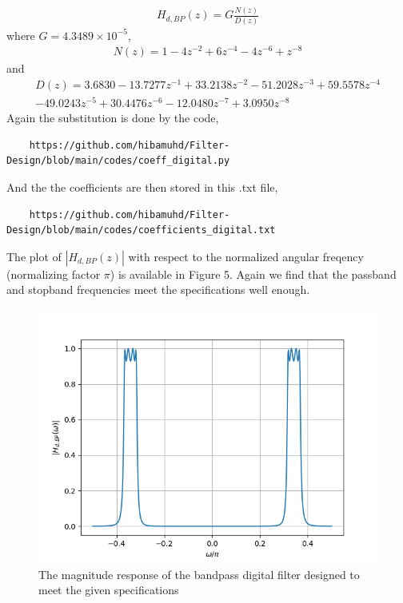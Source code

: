 \documentclass{article}
\begin{document}
\begin{eqnarray}
H_{d,BP}(z) = G \frac{N(z)}{D(z)}
\end{eqnarray}
where $G = 4.3489 \times 10^{-5}$,
\begin{eqnarray}
N(z)=  1 - 4 z^{-2} + 6 z^{-4} - 4z^{-6} + z^{-8} 
\end{eqnarray}
and
\begin{eqnarray}
D(z) = 3.6830  -13.7277z^{-1} + 33.2138z^{-2}  -51.2028z^{-3}+  59.5578z^{-4}\nonumber \\
  -49.0243z^{-5}+   30.4476z^{-6}  -12.0480z^{-7} +   3.0950z^{-8}
\end{eqnarray}
Again the substitution is done by the code,
\begin{lstlisting}
    https://github.com/hibamuhd/Filter-Design/blob/main/codes/coeff_digital.py
\end{lstlisting}
And the the coefficients are then stored in this .txt file,
\begin{lstlisting}
    https://github.com/hibamuhd/Filter-Design/blob/main/codes/coefficients_digital.txt
\end{lstlisting}
The plot of $|H_{d,BP}(z)|$ with respect to the normalized angular freqency (normalizing factor $\pi$) is available in Figure 5.  Again we
find that the passband and stopband frequencies meet the specifications well enough.
\begin{figure}
\label{fig4}
\includegraphics[width = 15cm]{figs/figure4.png}
\caption{The magnitude response of the bandpass digital filter designed to meet the given specifications}
\end{figure}
\end{document}
